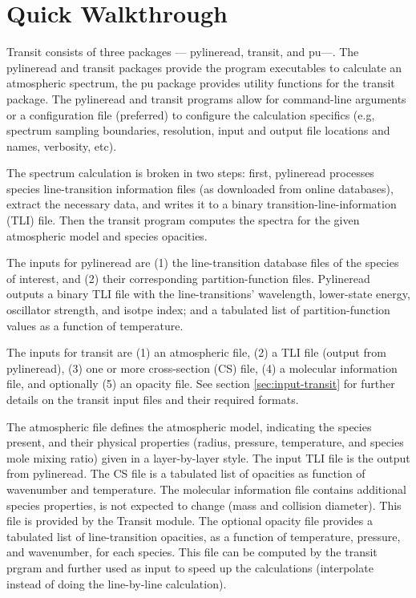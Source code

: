 \documentclass[letterpaper, 12pt]{article}
\begin{document}
\section{Quick Walkthrough}
\label{sec:walkthrough}

Transit consists of three packages --- pylineread, transit, and pu---.
The pylineread and transit packages provide the program executables to
calculate an atmospheric spectrum, the pu package provides utility
functions for the transit package.  The pylineread and transit
programs allow for command-line arguments or a configuration file
(preferred) to configure the calculation specifics (e.g, spectrum
sampling boundaries, resolution, input and output file locations and
names, verbosity, etc).

The spectrum calculation is broken in two steps: first, pylineread
processes species line-transition information files (as downloaded
from online databases), extract the necessary data, and writes it to a
binary transition-line-information (TLI) file.  Then the transit
program computes the spectra for the given atmospheric model and
species opacities.

The inputs for pylineread are (1) the line-transition database files
of the species of interest, and (2) their corresponding
partition-function files.  Pylineread outputs a binary TLI file with
the line-transitions' wavelength, lower-state energy, oscillator
strength, and isotpe index; and a tabulated list of partition-function
values as a function of temperature.

The inputs for transit are (1) an atmospheric file, (2) a TLI file
(output from pylineread), (3) one or more cross-section (CS) file,
(4) a molecular information file, and optionally (5) an opacity file.
See section \ref{sec:input-transit} for further details on the transit
input files and their required formats.

The atmospheric file defines the atmospheric model, indicating the
species present, and their physical properties (radius, pressure,
temperature, and species mole mixing ratio) given in a layer-by-layer
style.  The input TLI file is the output from pylineread.  The CS
file is a tabulated list of opacities as function of wavenumber
and temperature.  The molecular information file contains additional
species properties, is not expected to change (mass and collision
diameter).  This file is provided by the Transit module.  The optional
opacity file provides a tabulated list of line-transition opacities,
as a function of temperature, pressure, and wavenumber, for each
species.  This file can be computed by the transit prgram and further
used as input to speed up the calculations (interpolate instead of
doing the line-by-line calculation).
\end{document}
